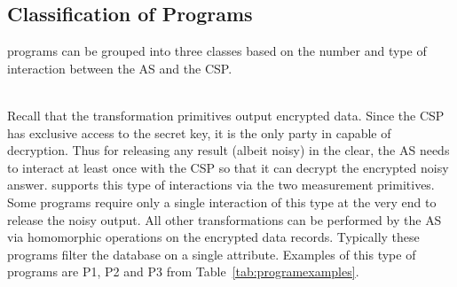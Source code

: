 
\subsection{Classification of \system Programs}
\system programs can be grouped into three classes based on the number and type of interaction between the \textsf{AS} and the \textsf{CSP}. 

\\
Recall that the transformation primitives output encrypted data.  Since  the \textsf{CSP} has exclusive access to the secret key, it is the only party in \system capable of decryption. Thus for releasing any result (albeit noisy) in the clear, the \textsf{AS} needs to interact at least once with the \textsf{CSP} so that it can decrypt the encrypted noisy answer. \system supports this type of interactions via the two measurement primitives. Some \system programs require only a single interaction of this type at the very end to release the noisy output. All other transformations can be performed by the \textsf{AS} via homomorphic operations on the encrypted data records. Typically these programs filter the database on a single attribute. Examples of this type of programs are P1, P2 and P3 from Table~\ref{tab:programexamples}.

